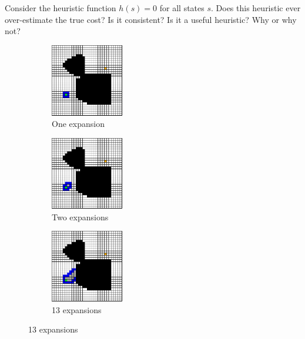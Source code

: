 \begin{exercise}
Consider the heuristic function $h(s)=0$ for all states $s$.  Does
this heuristic ever over-estimate the true cost?  Is it consistent?
Is it a useful heuristic?  Why or why not?
\end{exercise}

\begin{figure}
  \begin{center}
    \begin{subfigure}[t]{0.3\textwidth}
      \includegraphics[width=1.25in]{planning/figs/astar_0001.pdf}
       \caption{One expansion}
    \end{subfigure}
    \begin{subfigure}[t]{0.3\textwidth}
      \includegraphics[width=1.25in]{planning/figs/astar_0002.pdf}
       \caption{Two expansions}
    \end{subfigure}
    \begin{subfigure}[t]{0.3\textwidth}
      \includegraphics[width=1.25in]{planning/figs/astar_0013.pdf}
       \caption{13 expansions}
    \end{subfigure}

    \vspace{.2in}


\end{center}
\end{figure}
